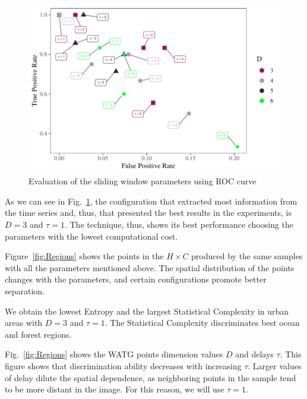 \documentclass[journal]{IEEEtran}
\begin{document}
\begin{figure}[hbt]
	\includegraphics[width=\columnwidth]{Figures/ROC.pdf}
	\caption{Evaluation of the sliding window parameters using ROC curve}
	\label{fig:ROC}
\end{figure} 

As we can see in Fig.~\ref{fig:ROC}, the configuration that extracted most information from the time series and, thus, that presented the best results in the experiments, is $D = 3$ and $\tau = 1$.
The technique, thus, shows its best performance choosing the parameters with the lowest computational cost.

Figure~\ref{fig:Regions} shows the points in the $H\times C$ produced by the same samples with all the parameters mentioned above.
The spatial distribution of the points changes with the parameters,
and certain configurations promote better separation.

We obtain the lowest Entropy and the largest Statistical Complexity
in urban areas 	with $ D = 3 $ and $ \tau = 1 $.
The Statistical Complexity discriminates best ocean and forest regions.

Fig.~\ref{fig:Regions} shows the WATG points dimension values $D$ and delays $\tau$.
%
This figure shows that discrimination ability decreases with increasing $\tau$.
Larger values of delay dilute the spatial dependence, as neighboring points in the sample tend to be more distant in the image.
For this reason, we will use $\tau=1$.
\end{document}
